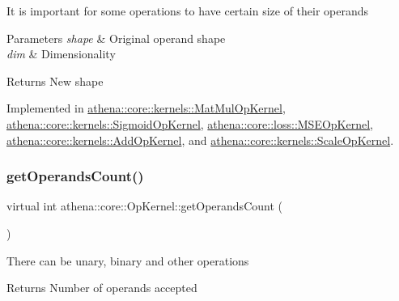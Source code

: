 It is important for some operations to have certain size of their operands 
\begin{DoxyParams}{Parameters}
{\em shape} & Original operand shape \\
\hline
{\em dim} & Dimensionality \\
\hline
\end{DoxyParams}
\begin{DoxyReturn}{Returns}
New shape 
\end{DoxyReturn}


Implemented in \mbox{\hyperlink{classathena_1_1core_1_1kernels_1_1_mat_mul_op_kernel_abdb57e6ce0d67ce6263e0716fed25243}{athena\+::core\+::kernels\+::\+Mat\+Mul\+Op\+Kernel}}, \mbox{\hyperlink{classathena_1_1core_1_1kernels_1_1_sigmoid_op_kernel_a0ea18b43eb9355d7a855202898ff09fc}{athena\+::core\+::kernels\+::\+Sigmoid\+Op\+Kernel}}, \mbox{\hyperlink{classathena_1_1core_1_1loss_1_1_m_s_e_op_kernel_a68a0220e3a3591638c7725b5cb659609}{athena\+::core\+::loss\+::\+M\+S\+E\+Op\+Kernel}}, \mbox{\hyperlink{classathena_1_1core_1_1kernels_1_1_add_op_kernel_a240d13047b8fd7676bf1f9d2bc94298f}{athena\+::core\+::kernels\+::\+Add\+Op\+Kernel}}, and \mbox{\hyperlink{classathena_1_1core_1_1kernels_1_1_scale_op_kernel_ad7c63973c62e28c0ad3d854ce16debf1}{athena\+::core\+::kernels\+::\+Scale\+Op\+Kernel}}.

\mbox{\label{classathena_1_1core_1_1_op_kernel_add97d4c132d80ecd9915acfedf7c9119}} 
\subsubsection{\texorpdfstring{get\+Operands\+Count()}{getOperandsCount()}}
{\footnotesize\ttfamily virtual int athena\+::core\+::\+Op\+Kernel\+::get\+Operands\+Count (\begin{DoxyParamCaption}{ }\end{DoxyParamCaption})\hspace{0.3cm}{\ttfamily [pure virtual]}}

There can be unary, binary and other operations \begin{DoxyReturn}{Returns}
Number of operands accepted 
\end{DoxyReturn}


